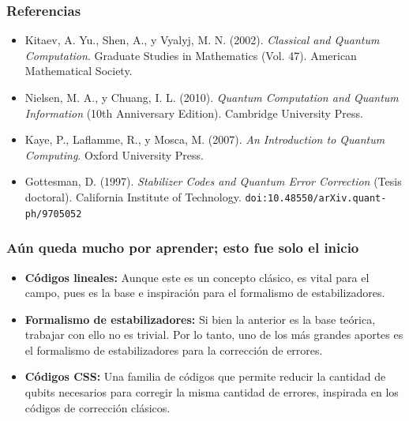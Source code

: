 \documentclass[english,9pt]{Linnaeus}
\begin{document}
    \begin{frame}
      \frametitle{Referencias}
      \begin{itemize}
        \item Kitaev, A. Yu., Shen, A., y Vyalyj, M. N. (2002). \textit{Classical and Quantum Computation}. Graduate Studies in Mathematics (Vol. 47). American Mathematical Society.

        \item Nielsen, M. A., y Chuang, I. L. (2010). \textit{Quantum Computation and Quantum Information} (10th Anniversary Edition). Cambridge University Press.

        \item Kaye, P., Laflamme, R., y Mosca, M. (2007). \textit{An Introduction to Quantum Computing}. Oxford University Press.
        \item Gottesman, D. (1997). \textit{Stabilizer Codes and Quantum Error Correction} (Tesis doctoral). California Institute of Technology. \texttt{doi:10.48550/arXiv.quant-ph/9705052}
      \end{itemize}
    \end{frame}

    \begin{frame}
      \frametitle{Aún queda mucho por aprender; esto fue solo el inicio}
      \begin{itemize}
        \item \textbf{Códigos lineales:} Aunque este es un concepto clásico, es vital para el campo, pues es la base e inspiración para el formalismo de estabilizadores.
        \item \textbf{Formalismo de estabilizadores:} Si bien la anterior es la base teórica, trabajar con ello no es trivial. Por lo tanto, uno de los más grandes aportes es el formalismo de estabilizadores para la corrección de errores.
        \item \textbf{Códigos CSS:} Una familia de códigos que permite reducir la cantidad de qubits necesarios para corregir la misma cantidad de errores, inspirada en los códigos de corrección clásicos.
      \end{itemize}
    \end{frame}
\end{document}
